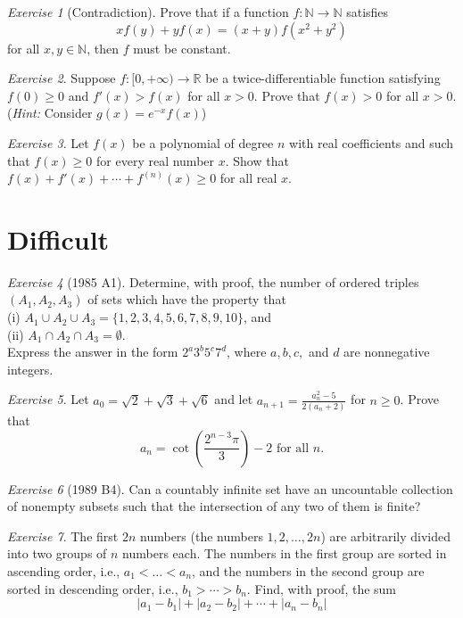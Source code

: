 \documentclass{article}
\theoremstyle{definition}
\theoremstyle{remark}
\newtheorem{exercise}{Exercise}
\newcommand{\NN}{\mathbb{N}}
\newcommand{\RR}{\mathbb{R}}
\begin{document}
\begin{exercise}[Contradiction]
Prove that if a function $f:\NN\to\NN$ satisfies
\[xf(y)+yf(x)=(x+y)f(x^2+y^2)\] for all $x,y \in \NN$, then $f$ must be constant.
\end{exercise}

\begin{exercise}
Suppose $f:[0,+\infty)\to \RR$ be a twice-differentiable function satisfying $f(0)\geq 0$ and $f'(x) > f(x)$ for all $x> 0$. Prove that $f(x)>0$ for all $x>0$. (\emph{Hint:} Consider $g(x)=e^{-x}f(x)$)
\end{exercise}

\begin{exercise}
Let $f(x)$ be a polynomial of degree $n$ with real coefficients and such that $f(x)\geq 0$ for every real number $x$. Show that $f(x)+f'(x)+\cdots + f^{(n)}(x)\geq 0$ for all real $x$. 
\end{exercise}


\section{Difficult}
\begin{exercise}[1985 A1]
Determine, with proof, the number of ordered triples $(A_1, A_2, A_3)$ of sets which have the property that\\
(i) $A_{1} \cup A_{2} \cup A_{3} = \{1, 2, 3, 4, 5, 6, 7, 8, 9, 10\}$, and\\
(ii) $A_{1} \cap A_{2} \cap A_{3} = \emptyset$.\\
Express the answer in the form $2^{a}3^{b}5^{c}7^{d}$, where $a, b, c,$ and $d$ are nonnegative integers. 
\end{exercise}

\begin{exercise}
Let $a_{0} = \sqrt{2} + \sqrt{3} + \sqrt{6}$ and let $a_{n + 1} = \frac{a_{n}^{2} - 5}{2(a_{n} + 2)}$ for $n \geq 0$. Prove that 
\[a_{n} = \cot{\left(\frac{2^{n - 3}\pi}{3}\right)} - 2 \text{ for all $n$.}
\]
\end{exercise}

\begin{exercise}[1989 B4]
Can a countably infinite set have an uncountable collection of nonempty subsets such that the intersection of any two of them is finite?
\end{exercise}

\begin{exercise}
The first $2n$ numbers (the numbers $1,2,\dots,2n$) are arbitrarily divided into two groups of $n$ numbers each. The numbers in the first group are sorted in ascending order, i.e., $a_1<\dots <a_n$, and the numbers in the second group are sorted in descending order, i.e., $b_1>\cdots > b_n$. Find, with proof, the sum
\[|a_1-b_1|+|a_2-b_2|+\cdots +|a_n-b_n|\]
\end{exercise}
\end{document}
